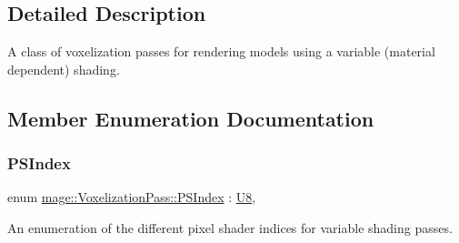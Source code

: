\subsection{Detailed Description}
A class of voxelization passes for rendering models using a variable (material dependent) shading. 

\subsection{Member Enumeration Documentation}
\hypertarget{classmage_1_1_voxelization_pass_a3632bab7b0039dbbe10569618ae57589}{}\label{classmage_1_1_voxelization_pass_a3632bab7b0039dbbe10569618ae57589} 
\subsubsection{\texorpdfstring{P\+S\+Index}{PSIndex}}
{\footnotesize\ttfamily enum \hyperlink{classmage_1_1_voxelization_pass_a3632bab7b0039dbbe10569618ae57589}{mage\+::\+Voxelization\+Pass\+::\+P\+S\+Index} \+: \hyperlink{namespacemage_afc638980bc6154f15af5e2d93a0e0ea9}{U8}\hspace{0.3cm}{\ttfamily [strong]}, {\ttfamily [private]}}

An enumeration of the different pixel shader indices for variable shading passes.

